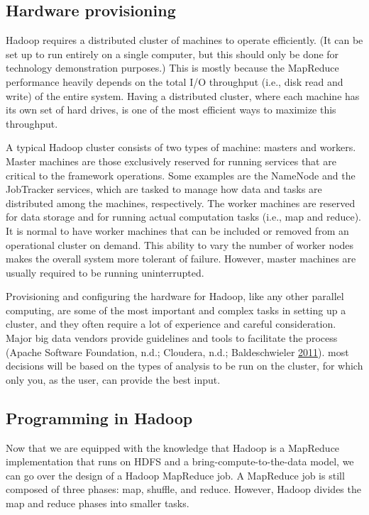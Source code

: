 \documentclass[]{krantz}
\begin{document}
\subsection{Hardware provisioning}\label{hardware-provisioning}

Hadoop requires a distributed cluster of machines to operate
efficiently. (It can be set up to run entirely on a single computer, but
this should only be done for technology demonstration purposes.) This is
mostly because the MapReduce performance heavily depends on the total
I/O throughput (i.e., disk read and write) of the entire system. Having
a distributed cluster, where each machine has its own set of hard
drives, is one of the most efficient ways to maximize this throughput.

A typical Hadoop cluster consists of two types of machine: masters and
workers. Master machines are those exclusively reserved for running
services that are critical to the framework operations. Some examples
are the NameNode and the JobTracker services, which are tasked to manage
how data and tasks are distributed among the machines, respectively. The
worker machines are reserved for data storage and for running actual
computation tasks (i.e., map and reduce). It is normal to have worker
machines that can be included or removed from an operational cluster on
demand. This ability to vary the number of worker nodes makes the
overall system more tolerant of failure. However, master machines are
usually required to be running uninterrupted.

Provisioning and configuring the hardware for Hadoop, like any other
parallel computing, are some of the most important and complex tasks in
setting up a cluster, and they often require a lot of experience and
careful consideration. Major big data vendors provide guidelines and
tools to facilitate the process (Apache Software Foundation, n.d.;
Cloudera, n.d.; Baldeschwieler
\protect\hyperlink{ref-Provisioning}{2011}). most decisions will be
based on the types of analysis to be run on the cluster, for which only
you, as the user, can provide the best input.

\subsection{Programming in Hadoop}\label{programming-in-hadoop}

Now that we are equipped with the knowledge that Hadoop is a MapReduce
implementation that runs on HDFS and a bring-compute-to-the-data model,
we can go over the design of a Hadoop MapReduce job. A MapReduce job is
still composed of three phases: map, shuffle, and reduce. However,
Hadoop divides the map and reduce phases into smaller tasks.
\end{document}
